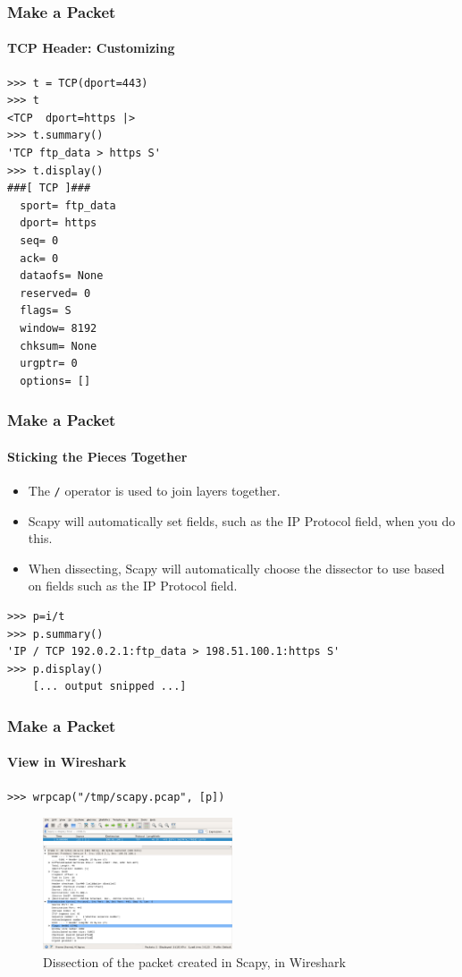 \documentclass[handout,notes]{beamer}
\newcommand{\todo}[1]{{\color{blue}{{\bf todo: }#1}}}
\begin{document}
\begin{frame}[fragile]
\frametitle{Make a Packet}
\framesubtitle{TCP Header: Customizing}
\begin{lstlisting}[caption={Customizing a TCP Header}]
>>> t = TCP(dport=443)
>>> t
<TCP  dport=https |>
>>> t.summary()
'TCP ftp_data > https S'
>>> t.display()
###[ TCP ]### 
  sport= ftp_data
  dport= https
  seq= 0
  ack= 0
  dataofs= None
  reserved= 0
  flags= S
  window= 8192
  chksum= None
  urgptr= 0
  options= []
\end{lstlisting}
\end{frame}


\begin{frame}[fragile]
\frametitle{Make a Packet}
\framesubtitle{Sticking the Pieces Together}
\begin{itemize}
\item{The \texttt{/} operator is used to join layers together.}
\item{Scapy will automatically set fields, such as the IP Protocol field, when
      you do this.}
\item{When dissecting, Scapy will automatically choose the dissector to use
      based on fields such as the IP Protocol field.}
\end{itemize}
\begin{lstlisting}[caption={Sticking the IP and TCP Headers Together}]
>>> p=i/t
>>> p.summary()
'IP / TCP 192.0.2.1:ftp_data > 198.51.100.1:https S'
>>> p.display()
    [... output snipped ...]
\end{lstlisting}
\end{frame}

\begin{frame}[fragile]
\frametitle{Make a Packet}
\framesubtitle{View in Wireshark}
\begin{lstlisting}[caption={Exporting a PCAP File from Scapy}]
>>> wrpcap("/tmp/scapy.pcap", [p])
\end{lstlisting}
\begin{figure}
\includegraphics[width=0.5\textwidth]{scapy-wireshark.png}
\caption{Dissection of the packet created in Scapy, in Wireshark}
\end{figure}
\end{frame}
\end{document}

